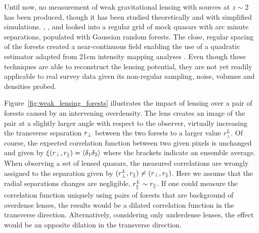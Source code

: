 Until now, no measurement of weak gravitational lensing with sources at 
$z\sim 2$ has been produced, though it has been studied theoretically and 
with simplified simulations. 
\cite{croftWeakLensingLyman2018}, 
\cite{metcalfNoiseEstimatesMeasurements2018}, and 
\cite{metcalfReconstructingGravitationalLensing2020a} looked into a regular grid 
of mock quasars with arc minute separations, populated with Gaussian random 
forests. The close, regular spacing of the forests created a near-continuous field
enabling the use of a quadratic estimator adapted from 21cm intensity mapping analyses
\cite{pourtsidouWeakLensing212014, pourtsidouGravitationalLensingCosmological2015}.
Even though these techniques are able to reconstruct the lensing potential, 
they are not yet readily applicable to real survey data given its non-regular
sampling, noise, volumes and densities probed. 


Figure~\ref{fig:weak_lensing_forests} illustrates the impact of lensing 
over a pair of \lya forests caused by an intervening overdensity. 
The lens creates an image of the pair at a slightly larger angle with 
respect to the observer, virtually increasing the transverse separation 
${r_\perp}$ between the two forests to a larger value $r_\perp^L$. Of course, 
the expected correlation function between two given pixels is unchanged 
and given by $\xi({r_\perp}, {r_\parallel}) = \langle \delta_1 \delta_2 \rangle$ 
where the brackets indicate an ensemble average. When observing a set 
of lensed quasars, the measured correlations are wrongly assigned to 
the separation given by $(r_\perp^L, {r_\parallel}) \neq ({r_\perp}, {r_\parallel})$. 
Here we assume that the radial separations changes are negligible, 
$r_\parallel^L \sim {r_\parallel}$. If one could measure the correlation function 
uniquely using pairs of forests that are background of overdense lenses, 
the results would be a dilated correlation function in the transverse 
direction. Alternatively, considering only underdense lenses, the effect 
would be an opposite dilation in the transverse direction. 



